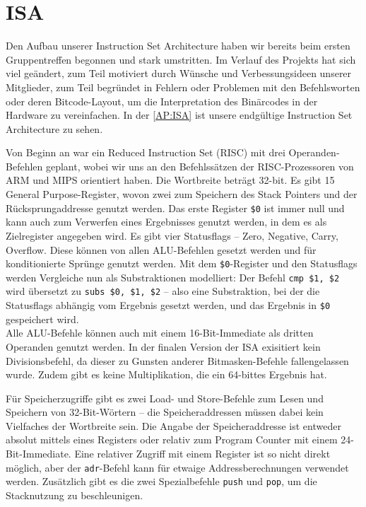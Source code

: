 \section{ISA}
Den Aufbau unserer Instruction Set Architecture haben wir bereits beim ersten Gruppentreffen begonnen und stark umstritten.
Im Verlauf des Projekts hat sich viel geändert, zum Teil motiviert durch Wünsche und Verbessungsideen unserer Mitglieder,
zum Teil begründet in Fehlern oder Problemen mit den Befehlsworten oder deren Bitcode-Layout, um die Interpretation des Binärcodes in der Hardware zu vereinfachen.
In der \autoref{AP:ISA} ist unsere endgültige Instruction Set Architecture zu sehen.

Von Beginn an war ein Reduced Instruction Set (RISC) mit drei Operanden-Befehlen geplant,
wobei wir uns an den Befehlssätzen der RISC-Prozessoren von ARM und MIPS orientiert haben.
Die Wortbreite beträgt 32-bit. Es gibt 15 General Purpose-Register, wovon zwei zum Speichern des Stack Pointers und der Rücksprungaddresse genutzt werden.
Das erste Register \texttt{\$0} ist immer null und kann auch zum Verwerfen eines Ergebnisses genutzt werden, in dem es als Zielregister angegeben wird.
Es gibt vier Statusflags -- Zero, Negative, Carry, Overflow.
Diese können von allen ALU-Befehlen gesetzt werden und für konditionierte Sprünge genutzt werden.
Mit dem \texttt{\$0}-Register und den Statusflags werden Vergleiche nun als Substraktionen modelliert:
Der Befehl \texttt{cmp \$1, \$2} wird übersetzt zu \texttt{subs \$0, \$1, \$2} --
also eine Substraktion, bei der die Statusflags abhängig vom Ergebnis gesetzt werden, und das Ergebnis in \texttt{\$0} gespeichert wird. \\
Alle ALU-Befehle können auch mit einem 16-Bit-Immediate als dritten Operanden genutzt werden.
In der finalen Version der ISA exisitiert kein Divisionsbefehl, da dieser zu Gunsten anderer Bitmasken-Befehle fallengelassen wurde.
Zudem gibt es keine Multiplikation, die ein 64-bittes Ergebnis hat.

Für Speicherzugriffe gibt es zwei Load- und Store-Befehle zum Lesen und Speichern von 32-Bit-Wörtern --
die Speicheraddressen müssen dabei kein Vielfaches der Wortbreite sein.
Die Angabe der Speicheraddresse ist entweder absolut mittels eines Registers oder relativ zum Program Counter mit einem 24-Bit-Immediate.
Eine relativer Zugriff mit einem Register ist so nicht direkt möglich, aber der \texttt{adr}-Befehl kann für etwaige Addressberechnungen verwendet werden.
Zusätzlich gibt es die zwei Spezialbefehle \texttt{push} und \texttt{pop}, um die Stacknutzung zu beschleunigen.

